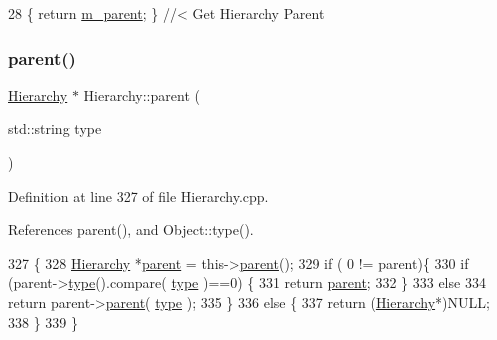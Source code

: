 \begin{DoxyCode}
28 \{ \textcolor{keywordflow}{return} \hyperlink{classHierarchy_a5814bb280d4e8539ab25ab6cbfb9cc4f}{m\_parent}; \}  \textcolor{comment}{//< Get Hierarchy Parent}
\end{DoxyCode}
\mbox{\label{classHierarchy_ad550588733bf75ac5c0fcfd7c8fd11a6}} 
\subsubsection{\texorpdfstring{parent()}{parent()}\hspace{0.1cm}{\footnotesize\ttfamily [2/2]}}
{\footnotesize\ttfamily \hyperlink{classHierarchy}{Hierarchy} $\ast$ Hierarchy\+::parent (\begin{DoxyParamCaption}\item[{std\+::string}]{type }\end{DoxyParamCaption})}



Definition at line 327 of file Hierarchy.\+cpp.



References parent(), and Object\+::type().


\begin{DoxyCode}
327                                             \{
328   \hyperlink{classHierarchy}{Hierarchy} *\hyperlink{classHierarchy_a1c7bec8257e717f9c1465e06ebf845fc}{parent} = this->\hyperlink{classHierarchy_a1c7bec8257e717f9c1465e06ebf845fc}{parent}();
329   \textcolor{keywordflow}{if} ( 0 != parent)\{
330     \textcolor{keywordflow}{if} (parent->\hyperlink{classObject_a84f99f70f144a83e1582d1d0f84e4e62}{type}().compare( \hyperlink{classObject_a84f99f70f144a83e1582d1d0f84e4e62}{type} )==0) \{
331       \textcolor{keywordflow}{return} \hyperlink{classHierarchy_a1c7bec8257e717f9c1465e06ebf845fc}{parent};
332     \}
333     \textcolor{keywordflow}{else}
334       \textcolor{keywordflow}{return} parent->\hyperlink{classHierarchy_a1c7bec8257e717f9c1465e06ebf845fc}{parent}( \hyperlink{classObject_a84f99f70f144a83e1582d1d0f84e4e62}{type} );
335   \}
336   \textcolor{keywordflow}{else} \{
337     \textcolor{keywordflow}{return} (\hyperlink{classHierarchy}{Hierarchy}*)NULL;
338   \}
339 \}
\end{DoxyCode}
\mbox{\label{classHierarchy_aa7990fa7caf132d83e361ce033c6c65a}} 
